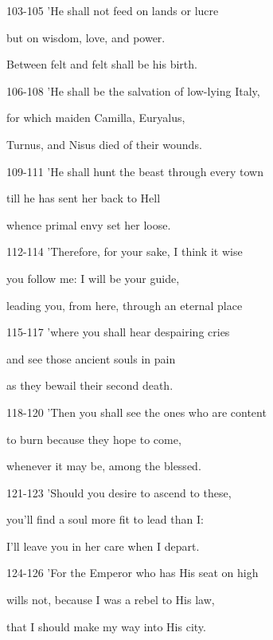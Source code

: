 \documentclass[oneside]{ctexbook}
\begin{document}
\begin{mytext}{103-105}
'He shall not feed on lands or lucre

but on wisdom, love, and power.

Between felt and felt shall be his birth.
\end{mytext}

\begin{mytext}{106-108}
'He shall be the salvation of low-lying Italy,

for which maiden Camilla, Euryalus,

Turnus, and Nisus died of their wounds.
\end{mytext}

\begin{mytext}{109-111}
'He shall hunt the beast through every town

till he has sent her back to Hell

whence primal envy set her loose.
\end{mytext}

\begin{mytext}{112-114}
'Therefore, for your sake, I think it wise

you follow me: I will be your guide,

leading you, from here, through an eternal place
\end{mytext}

\begin{mytext}{115-117}
'where you shall hear despairing cries

and see those ancient souls in pain

as they bewail their second death.
\end{mytext}

\begin{mytext}{118-120}
'Then you shall see the ones who are content

to burn because they hope to come,

whenever it may be, among the blessed.
\end{mytext}

\begin{mytext}{121-123}
'Should you desire to ascend to these,

you'll find a soul more fit to lead than I:

I'll leave you in her care when I depart.
\end{mytext}

\begin{mytext}{124-126}
'For the Emperor who has His seat on high

wills not, because I was a rebel to His law,

that I should make my way into His city.
\end{mytext}
\end{document}
